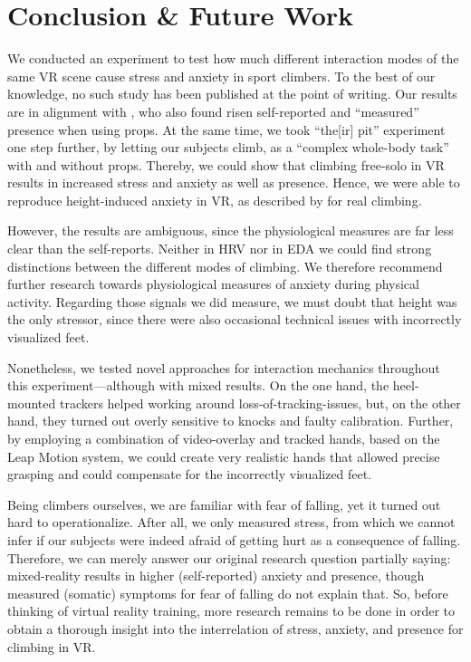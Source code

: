 \section{Conclusion \& Future Work}

We conducted an experiment to test how much different interaction modes of the same \gls{VR} scene cause stress and anxiety in sport climbers. To the best of our knowledge, no such study has been published at the point of writing. Our results are in alignment with  \textcite{Insko2001, Meehan2001}, who also found risen self-reported and “measured” presence when using props. At the same time, we took “the[ir] pit” experiment one step further, by letting our subjects climb, as a “complex whole-body task” \autocite{Pijpers2005} with and without props. Thereby, we could show that climbing \gls{free-solo} in \gls{VR} results in increased stress and anxiety as well as presence. Hence, we were able to reproduce height-induced anxiety in \gls{VR}, as described by \textcite{Hardy2007,Pijpers2006} for real climbing.

However, the results are ambiguous, since the physiological measures are far less clear than the self-reports. Neither in \gls{HRV} nor in \gls{EDA} we could find strong distinctions between the different modes of climbing. We therefore recommend further research towards physiological measures of anxiety during physical activity. Regarding those signals we did measure, we must doubt that height was the only stressor, since there were also occasional technical issues with incorrectly visualized feet.

Nonetheless, we tested novel approaches for interaction mechanics throughout this experiment---although with mixed results. On the one hand, the heel-mounted trackers helped working around loss-of-tracking-issues, but, on the other hand, they turned out overly sensitive to knocks and faulty calibration. Further, by employing a combination of video-overlay and tracked hands, based on the Leap Motion system, we could create very realistic hands that allowed precise grasping and could compensate for the incorrectly visualized feet.

Being climbers ourselves, we are familiar with fear of falling, yet it turned out hard to operationalize. After all, we only measured stress, from which we cannot infer if our subjects were indeed afraid of getting hurt as a consequence of falling. Therefore, we can merely answer our original research question partially saying: mixed-reality results in higher (self-reported) anxiety and presence, though measured (somatic) symptoms for fear of falling do not explain that. So, before thinking of virtual reality  training, more research remains to be done in order to obtain a thorough insight into the interrelation of stress, anxiety, and presence for climbing in \gls{VR}.